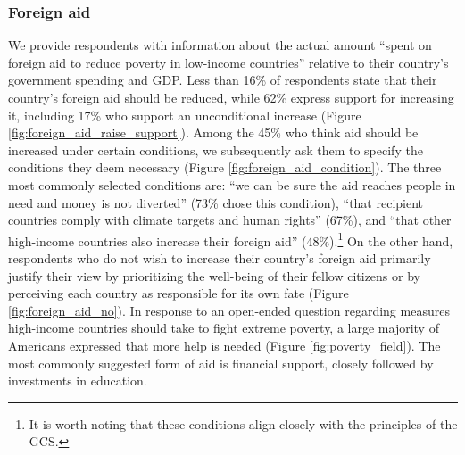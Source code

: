 \subsubsection{Foreign aid}\label{subsubsec:support_foreign_aid} %

We provide respondents with information about the actual amount ``spent on foreign aid to reduce poverty in low-income countries'' relative to their country's government spending and GDP. Less than 16\% of respondents state that their country's foreign aid should be reduced, while 62\% express support for increasing it, including 17\% who support an unconditional increase (Figure \ref{fig:foreign_aid_raise_support}). Among the 45\% who think aid should be increased under certain conditions, we subsequently ask them to specify the conditions they deem necessary (Figure \ref{fig:foreign_aid_condition}). The three most commonly selected conditions are: ``we can be sure the aid reaches people in need and money is not diverted'' (73\% chose this condition), ``that recipient countries comply with climate targets and human rights'' (67\%), and ``that other high-income countries also increase their foreign aid'' (48\%).\footnote{It is worth noting that these conditions align closely with the principles of the GCS.} 
On the other hand, respondents who do not wish to increase their country's foreign aid primarily justify their view by prioritizing the well-being of their fellow citizens or by perceiving each country as responsible for its own fate (Figure \ref{fig:foreign_aid_no}). In response to an open-ended question regarding measures high-income countries should take to fight extreme poverty, a large majority of Americans expressed that more help is needed (Figure \ref{fig:poverty_field}). The most commonly suggested form of aid is financial support, closely followed by investments in education. 


